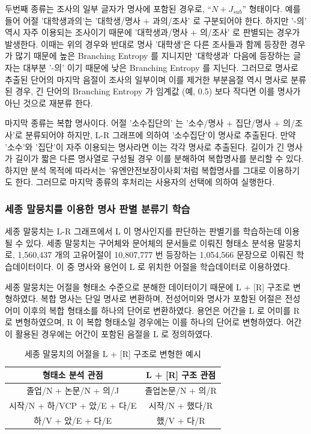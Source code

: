 \documentclass[11pt]{article}
\begin{document}
두번째 종류는 조사의 일부 글자가 명사에 포함된 경우로, “$N + J_{sub}$” 형태이다.
예를 들어 어절 '대학생과의'는 '대학생/명사 + 과의/조사' 로 구분되어야 한다.
하지만 '-의' 역시 자주 이용되는 조사이기 때문에 '대학생과/명사 + 의/조사' 로 판별되는 경우가 발생한다.
이때는 위의 경우와 반대로 명사 '대학생'은 다른 조사들과 함께 등장한 경우가 많기 때문에 높은 Branching Entropy 를 지니지만 '대학생과' 다음에 등장하는 글자는 대부분 '-의' 이기 때문에 낮은 Branching Entropy 를 지닌다.
그러므로 명사로 추출된 단어의 마지막 음절이 조사의 일부이며 이를 제거한 부분음절 역시 명사로 분류된 경우, 긴 단어의 Branching Entropy 가 임계값 (예, 0.5) 보다 작다면 이를 명사가 아닌 것으로 재분류 한다.

마지막 종류는 복합 명사이다.
어절 '소수집단의' 는 '소수/명사 + 집단/명사 + 의/조사'로 분류되어야 하지만, L-R 그래프에 의하여 '소수집단'이 명사로 추출된다.
만약 '소수'와 '집단'이 자주 이용되는 명사라면 이는 각각 명사로 추출된다.
길이가 긴 명사가 길이가 짧은 다른 명사열로 구성될 경우 이를 분해하여 복합명사를 분리할 수 있다.
하지만 분석 목적에 따라서는 '유엔안전보장이사회'처럼 복합명사를 그대로 이용하기도 한다.
그러므로 마지막 종류의 후처리는 사용자의 선택에 의하여 실행한다.

\subsubsection{세종 말뭉치를 이용한 명사 판별 분류기 학습}

세종 말뭉치는 L-R 그래프에서 L 이 명사인지를 판단하는 판별기를 학습하는데 이용될 수 있다.
세종 말뭉치는 구어체와 문어체의 문서들로 이뤄진 형태소 분석용 말뭉치로, 1,560,437 개의 고유어절이 10,807,777 번 등장하는 1,054,566 문장으로 이뤄진 학습데이터이다.
이 중 명사와 용언이 L 로 위치한 어절을 학습데이터로 이용하였다.

세종 말뭉치는 어절을 형태소 수준으로 분해한 데이터이기 때문에 L + [R] 구조로 변형하였다.
복합 명사는 단일 명사로 변환하며, 전성어미와 명사가 포함된 어절은 전성어미 이후의 복합 형태소를 하나의 단어로 변환하였다.
용언은 어간을 L 로 어미를 R 로 변형하였으며, R 이 복합 형태소일 경우에는 이를 하나의 단어로 변형하였다.
어간이 활용된 경우에는 어간이 포함된 음절을 L 로 정의하였다.

\begin{table}[H]
\centering
\caption{세종 말뭉치의 어절을 L + [R] 구조로 변형한 예시}
\label{tab:lrstructure}
\begin{tabular}{|c|c|}
\hline
\rowcolor[HTML]{EFEFEF} 
\textbf{형태소 분석 관점} & \textbf{L + [R] 구조 관점} \\ \hline
졸업/N + 논문/N + 의/J & 졸업논문/N + 의/R \\ \hline
시작/N + 하/VCP + 았/E + 다/E & 시작/N + 했다/R \\ \hline
하/V + 았/E + 다/E & 했/V + 다/R \\ \hline
\end{tabular}%
\end{table}
\end{document}
